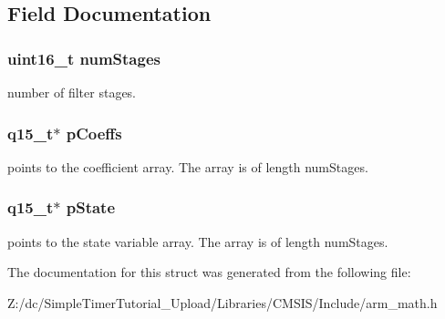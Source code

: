 \subsection{Field Documentation}
\hypertarget{structarm__fir__lattice__instance__q15_a4cceb90547b3e585d4c7aabaa8057212}{
\subsubsection[{num\-Stages}]{\setlength{\rightskip}{0pt plus 5cm}uint16\-\_\-t num\-Stages}}\label{structarm__fir__lattice__instance__q15_a4cceb90547b3e585d4c7aabaa8057212}
number of filter stages. \hypertarget{structarm__fir__lattice__instance__q15_a7ca181a37f714d174445f486bebce26f}{
\subsubsection[{p\-Coeffs}]{\setlength{\rightskip}{0pt plus 5cm}q15\-\_\-t$\ast$ p\-Coeffs}}\label{structarm__fir__lattice__instance__q15_a7ca181a37f714d174445f486bebce26f}
points to the coefficient array. The array is of length num\-Stages. \hypertarget{structarm__fir__lattice__instance__q15_ae29dfdb736374fcddaeaec4b7770170c}{
\subsubsection[{p\-State}]{\setlength{\rightskip}{0pt plus 5cm}q15\-\_\-t$\ast$ p\-State}}\label{structarm__fir__lattice__instance__q15_ae29dfdb736374fcddaeaec4b7770170c}
points to the state variable array. The array is of length num\-Stages. 

The documentation for this struct was generated from the following file\-:\begin{DoxyCompactItemize}
\item 
Z\-:/dc/\-Simple\-Timer\-Tutorial\-\_\-\-Upload/\-Libraries/\-C\-M\-S\-I\-S/\-Include/arm\-\_\-math.\-h\end{DoxyCompactItemize}
